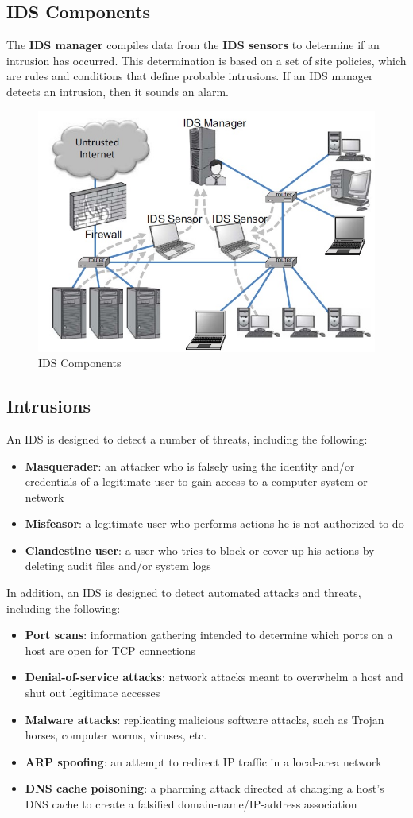 \subsection{IDS Components}
The \textbf{IDS manager} compiles data from the \textbf{IDS sensors} to determine if an intrusion has occurred. This determination is based on a set of site policies, which are rules and conditions that define probable intrusions. If an IDS manager detects an intrusion, then it sounds an alarm.
\begin{figure}[htbp]
	\centering
	\includegraphics[width=0.5\linewidth]{Immagini/firewalls/IDS.png}
	\caption{IDS Components} 	
	\label{fig:IDS_components}
\end{figure}
\subsection{Intrusions}
An IDS is designed to detect a number of threats, including the following:
\begin{itemize}
\item \textbf{Masquerader}: an attacker who is falsely using the identity and/or credentials of a legitimate user to gain access to a computer system or network
\item \textbf{Misfeasor}: a legitimate user who performs actions he is not authorized to do 
\item \textbf{Clandestine user}: a user who tries to block or cover up his actions by deleting audit files and/or system logs
\end{itemize}
In addition, an IDS is designed to detect automated attacks and threats, including the following:
\begin{itemize}
\item \textbf{Port scans}: information gathering intended to determine which ports on a host are open for TCP connections
\item \textbf{Denial-of-service attacks}: network attacks meant to overwhelm a host and shut out legitimate accesses
\item \textbf{Malware attacks}: replicating malicious software attacks, such as Trojan horses, computer worms, viruses, etc.
\item \textbf{ARP spoofing}: an attempt to redirect IP traffic in a local-area network
\item \textbf{DNS cache poisoning}: a pharming attack directed at changing a host's DNS cache to create a falsified domain-name/IP-address association
\end{itemize}
